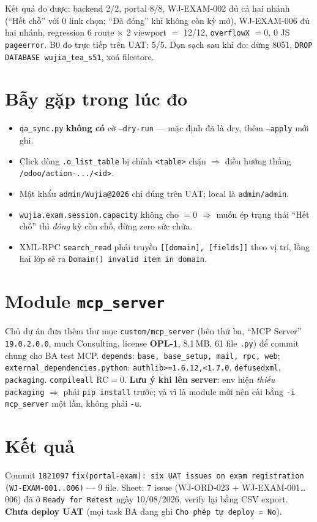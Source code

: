 Kết quả đo được: backend 2/2, portal 8/8, WJ-EXAM-002 đủ cả hai nhánh (``Hết chỗ'' với 0 link
chọn; ``Đã đóng'' khi không còn kỳ mở), WJ-EXAM-006 đủ hai nhánh, regression 6 route $\times$ 2
viewport $=$ 12/12, \texttt{overflowX} $=0$, 0 JS \texttt{pageerror}. B0 đo trực tiếp trên UAT:
5/5. Dọn sạch sau khi đo: dừng 8051, \texttt{DROP DATABASE wujia\_tea\_s51}, xoá filestore.

\section{Bẫy gặp trong lúc đo}

\begin{itemize}
  \item \texttt{qa\_sync.py} \textbf{không có} cờ \texttt{--dry-run} --- mặc định đã là dry, thêm
    \texttt{--apply} mới ghi.
  \item Click dòng \texttt{.o\_list\_table} bị chính \texttt{<table>} chặn $\Rightarrow$ điều
    hướng thẳng \texttt{/odoo/action-.../<id>}.
  \item Mật khẩu \texttt{admin/Wujia@2026} chỉ đúng trên UAT; local là \texttt{admin/admin}.
  \item \texttt{wujia.exam.session.capacity} không cho $=0$ $\Rightarrow$ muốn ép trạng thái
    ``Hết chỗ'' thì \emph{đóng} kỳ còn chỗ, đừng zero sức chứa.
  \item XML-RPC \texttt{search\_read} phải truyền \texttt{[[domain], [fields]]} theo vị trí, lồng
    hai lớp sẽ ra \texttt{Domain() invalid item in domain}.
\end{itemize}

\section{Module \texttt{mcp\_server}}

Chủ dự án đưa thêm thư mục \texttt{custom/mcp\_server} (bên thứ ba, ``MCP Server''
\texttt{19.0.2.0.0}, much Consulting, license \textbf{OPL-1}, 8.1\,MB, 61 file \texttt{.py}) để
commit chung cho BA test MCP. \texttt{depends}: \texttt{base, base\_setup, mail, rpc, web};
\texttt{external\_dependencies.python}: \texttt{authlib>=1.6.12,<1.7.0}, \texttt{defusedxml},
\texttt{packaging}. \texttt{compileall} RC$=$0. \textbf{Lưu ý khi lên server}: env hiện
\emph{thiếu} \texttt{packaging} $\Rightarrow$ phải \texttt{pip install} trước; và vì là module
mới nên cài bằng \texttt{-i mcp\_server} một lần, không phải \texttt{-u}.

\section{Kết quả}

Commit \texttt{1821097} \texttt{fix(portal-exam): six UAT issues on exam registration
(WJ-EXAM-001..006)} --- 9 file. Sheet: 7 issue (WJ-ORD-023 $+$ WJ-EXAM-001\ldots006) đã ở
\texttt{Ready for Retest} ngày 10/08/2026, verify lại bằng CSV export. \textbf{Chưa deploy UAT}
(mọi task BA đang ghi \texttt{Cho phép tự deploy = No}).
